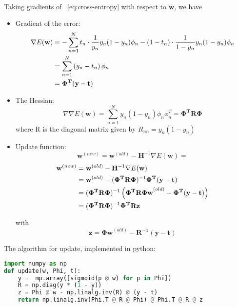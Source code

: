 \documentclass[reqno]{amsart}
\begin{document}
\begin{enumerate}[label=\textbf{(\Roman*)}]
        Taking gradients of ~\eqref{eq:cross-entropy} with respect to \(\mathbf{w}\), we have
        \begin{itemize}
            \item Gradient of the error: \begin{align}
                \begin{split}
                    \nabla E(\mathbf{w}) &= - \sum_{n = 1}^{N} t_n \cdot \frac{1}{y_n} y_n (1 - y_n) \phi_n - (1 - t_n) \cdot \frac{1}{1 - y_n} y_n (1 - y_n) \phi_n \\
                    &= \sum_{n = 1}^{N} \left(y_n - t_n\right) \phi_n \\
                    &= \mathbf{\Phi^T(y - t)}
                \end{split}
            \end{align}
            \item The Hessian: \[\nabla \nabla E(\mathbf{w}) = \sum_{n = 1}^{N} y_n (1 - y_n) \phi_n \phi_n^T = \mathbf{\Phi^T R \Phi}\] where R is the diagonal matrix given by \(R_{nn} = y_n (1 - y_n)\)
            \item Update function: \[\mathbf{w}^{(new)} = \mathbf{w}^{(old)} - \mathbf{H}^{-1} \nabla E(\mathbf{w}) = \]
            \begin{align}
                \begin{split}
                    \mathbf{w}^{(new)} &= \mathbf{w}^{(old)} - \mathbf{H}^{-1} \nabla E(\mathbf{w}) \\
                            &= \mathbf{w}^{(old)} - (\mathbf{\Phi^T R \Phi})^{-1} \mathbf{\Phi^T(y - t)} \\
                            &= (\mathbf{\Phi^T R \Phi})^{-1} \left(\mathbf{\Phi^T R \Phi w}^{(old)} - \mathbf{\Phi^T(y - t)}\right) \\
                            &= (\mathbf{\Phi^T R \Phi})^{-1} \mathbf{\Phi^T R z} \label{eq:update}
                \end{split}
            \end{align}

            with \[\mathbf{z} = \mathbf{\Phi w}^{(old)} - \mathbf{R^{-1} (y - t)}\]
        \end{itemize}

        The algorithm for update, implemented in python:

        \begin{lstlisting}[language=Python]
import numpy as np
def update(w, Phi, t):
    y =  mp.array([sigmoid(p @ w) for p in Phi])
    R = np.diag(y * (1 - y))
    z = Phi @ w - np.linalg.inv(R) @ (y - t)
    return np.linalg.inv(Phi.T @ R @ Phi) @ Phi.T @ R @ z
        \end{lstlisting}


\end{enumerate}
\end{document}
